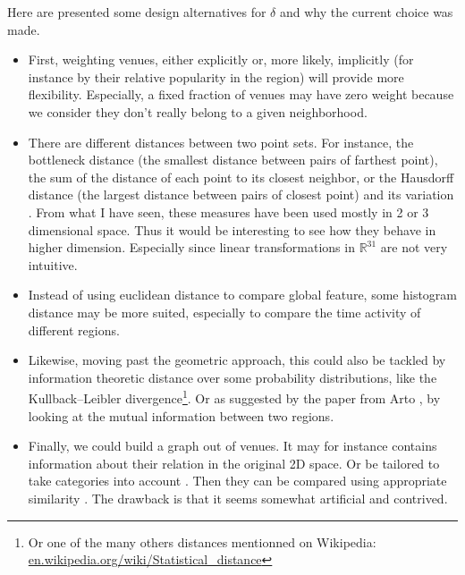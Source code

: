 \documentclass[a4paper,11pt,draft]{scrartcl}
\newcommand{\autocite}[1]{}
\newcommand{\href}[2]{#2}
\begin{document}
Here are presented some design alternatives for $\delta$ and why the current
choice was made.

\begin{itemize}
    \item First, weighting venues, either explicitly or, more likely,
        implicitly (for instance by their relative popularity in the region)
        will provide more flexibility. Especially, a fixed fraction of venues
        may have zero weight because we consider they don't really belong to a
        given neighborhood.
    \item There are different distances between two point sets. For instance,
        the bottleneck distance \autocite{Bottleneck96} (the smallest distance
        between pairs of farthest point), the sum of the distance of each
        point to its closest neighbor, or the Hausdorff distance (the largest
        distance between pairs of closest point) and its variation
        \autocite{ModifiedHausdorff94}. From what I have seen, these measures
        have been used mostly in 2 or 3 dimensional space.  Thus it would be
        interesting to see how they behave in higher dimension.  Especially
        since linear transformations in $\mathbb{R}^{31}$ are not very
        intuitive.
    \item Instead of using euclidean distance to compare global feature, some
	    histogram distance \autocite{HistogramDistance02} may be more suited,
        especially to compare the time activity of different regions.
    \item Likewise, moving past the geometric approach, this could also be
        tackled by information theoretic distance over some probability
        distributions, like the Kullback--Leibler divergence\footnote{Or one
        of the many others distances mentionned on Wikipedia:
        \href{https://en.wikipedia.org/wiki/Statistical_distance}%
        {\url{en.wikipedia.org/wiki/Statistical_distance}}}. Or as suggested
        by the paper from Arto \autocite{InfoMatching10}, by looking at the
        mutual information between two regions.
    \item Finally, we could build a graph out of venues. It may for instance
        contains information about their relation in the original 2D space. Or
        be tailored to take categories into account \autocite{fitting09}. Then
        they can be compared using appropriate similarity
        \autocite{GraphSimilarity14}. The drawback is that it seems somewhat
        artificial and contrived.
\end{itemize}
\end{document}
